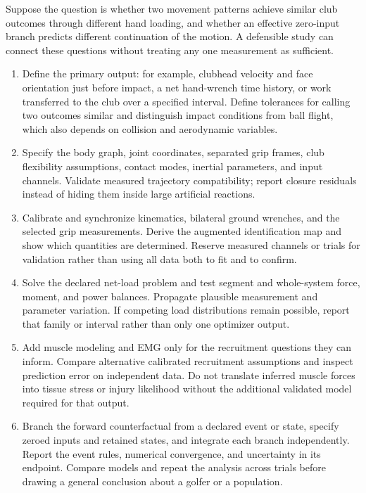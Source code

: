 Suppose the question is whether two movement patterns achieve similar club
outcomes through different hand loading, and whether an effective zero-input
branch predicts different continuation of the motion. A defensible study can
connect these questions without treating any one measurement as sufficient.

\begin{enumerate}
\item Define the primary output: for example, clubhead velocity and face
      orientation just before impact, a net hand-wrench time history, or work
      transferred to the club over a specified interval. Define tolerances for
      calling two outcomes similar and distinguish impact conditions from ball
      flight, which also depends on collision and aerodynamic variables.
\item Specify the body graph, joint coordinates, separated grip frames, club
      flexibility assumptions, contact modes, inertial parameters, and input
      channels. Validate measured trajectory compatibility; report closure
      residuals instead of hiding them inside large artificial reactions.
\item Calibrate and synchronize kinematics, bilateral ground wrenches, and the
      selected grip measurements. Derive the augmented identification map and
      show which quantities are determined. Reserve measured channels or trials
      for validation rather than using all data both to fit and to confirm.
\item Solve the declared net-load problem and test segment and whole-system
      force, moment, and power balances. Propagate plausible measurement and
      parameter variation. If competing load distributions remain possible,
      report that family or interval rather than only one optimizer output.
\item Add muscle modeling and EMG only for the recruitment questions they can
      inform. Compare alternative calibrated recruitment assumptions and
      inspect prediction error on independent data. Do not translate inferred
      muscle forces into tissue stress or injury likelihood without the
      additional validated model required for that output.
\item Branch the forward counterfactual from a declared event or state, specify
      zeroed inputs and retained states, and integrate each branch independently.
      Report the event rules, numerical convergence, and uncertainty in its
      endpoint. Compare models and repeat the analysis across trials before
      drawing a general conclusion about a golfer or a population.
\end{enumerate}

